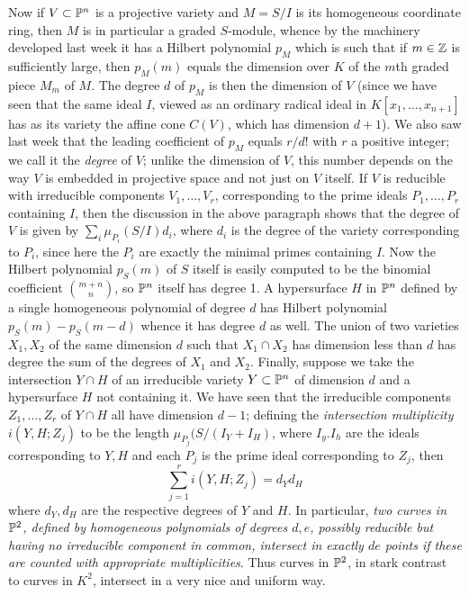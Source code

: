 \documentclass[10pt]{article}
\begin{document}
Now if $V\subset\Bbb P^n$ is a projective variety and $M=S/I$ is its
homogeneous coordinate ring, then $M$ is in particular a graded
$S$-module, whence by the machinery developed last week it has a Hilbert
polynomial $p_M$ which is such that if $m\in\Bbb Z$ is sufficiently
large, then $p_M(m)$ equals the dimension over $K$ of the $m$th graded
piece $M_m$ of $M$. The degree $d$ of $p_M$ is then the dimension of $V$
(since we have seen that the same ideal $I$, viewed as an ordinary
radical ideal in $K[x_1,\ldots,x_{n+1}]$ has as its variety the affine
cone $C(V)$, which has dimension $d+1$). We also saw last week that the
leading coefficient of $p_M$ equals $r/d!$ with $r$ a positive integer;
we call it the {\sl degree} of $V$; unlike the dimension of $V$, this
number depends on the way $V$ is embedded in projective space and not
just on $V$ itself. If $V$ is reducible with irreducible components
$V_1,\ldots,V_r$, corresponding to the prime ideals $P_1,\ldots,P_r$
containing $I$, then the discussion in the above paragraph shows that
the degree of $V$ is given by $\sum_i \mu_{P_i}(S/I) d_i$, where $d_i$
is the degree of the variety corresponding to $P_i$, since here the
$P_i$ are exactly the minimal primes containing $I$. Now the Hilbert
polynomial $p_S(m)$ of $S$ itself is easily computed to be the binomial
coefficient $m+n\choose n$, so $\Bbb P^n$ itself has degree 1. A
hypersurface $H$ in $\Bbb P^n$ defined by a single homogeneous
polynomial of degree $d$ has Hilbert polynomial $p_S(m) - p_S(m-d)$
whence it has degree $d$ as well. The union of two varieties $X_1,X_2$
of the same dimension $d$ such that $X_1\cap X_2$ has dimension less
than $d$ has degree the sum of the degrees of $X_1$ and $X_2$. Finally,
suppose we take the intersection $Y\cap H$ of an irreducible variety
$Y\subset\Bbb P^n$ of dimension $d$ and a hypersurface $H$ not
containing it. We have seen that the irreducible components
$Z_1,\ldots,Z_r$ of $Y\cap H$ all have dimension $d-1$; defining the
{\sl intersection multiplicity} $i(Y,H;Z_j)$ to be the length
$\mu_{P_j}(S/(I_Y + I_H)$, where $I_y.I_h$ are the ideals corresponding
to $Y,H$ and each $P_j$ is the prime ideal corresponding to $Z_j$, then
 $$
 \sum_{j=1}^r i(Y,H;Z_j) = d_Y d_H
 $$
 \noindent where $d_Y,d_H$ are the respective degrees of $Y$ and $H$. In
 particular, {\sl two curves in $\Bbb P^2$, defined by homogeneous
   polynomials of degrees $d,e$, possibly reducible but having no
   irreducible component in common, intersect in exactly $de$ points if
   these are counted with appropriate multiplicities}. Thus curves in
 $\Bbb P^2$, in stark contrast to curves in $K^2$, intersect in a very
 nice and uniform way.
\end{document}
